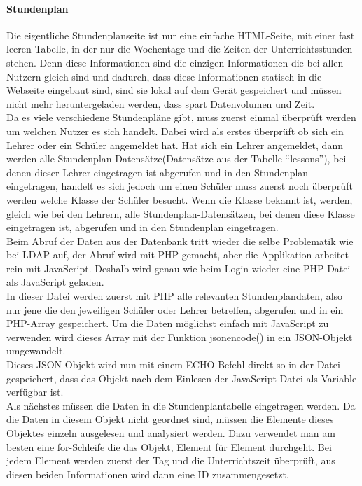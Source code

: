 \paragraph{Stundenplan\\}
Die eigentliche Stundenplanseite ist nur eine einfache HTML-Seite, mit einer fast leeren Tabelle, in der nur die Wochentage und die Zeiten der Unterrichtsstunden stehen. Denn diese Informationen sind die einzigen Informationen die bei allen Nutzern gleich sind und dadurch, dass diese Informationen statisch in die Webseite eingebaut sind, sind sie lokal auf dem Gerät gespeichert und müssen nicht mehr heruntergeladen werden, dass spart Datenvolumen und Zeit.\\
Da es viele verschiedene Stundenpläne gibt, muss zuerst einmal überprüft werden um welchen Nutzer es sich handelt. Dabei wird als erstes überprüft ob sich ein Lehrer oder ein Schüler angemeldet hat. Hat sich ein Lehrer angemeldet, dann werden alle Stundenplan-Datensätze(Datensätze aus der Tabelle \enquote{lessons}), bei denen dieser Lehrer eingetragen ist abgerufen und in den Stundenplan eingetragen, handelt es sich jedoch um einen Schüler muss zuerst noch überprüft werden welche Klasse der Schüler besucht. Wenn die Klasse bekannt ist, werden, gleich wie bei den Lehrern, alle Stundenplan-Datensätzen, bei denen diese Klasse eingetragen ist, abgerufen und in den Stundenplan eingetragen.\\
Beim Abruf der Daten aus der Datenbank tritt wieder die selbe Problematik wie bei LDAP auf, der Abruf wird mit PHP gemacht, aber die Applikation arbeitet rein mit JavaScript. Deshalb wird genau wie beim Login wieder eine PHP-Datei als JavaScript geladen.\\
In dieser Datei werden zuerst mit PHP alle relevanten Stundenplandaten, also nur jene die den jeweiligen Schüler oder Lehrer betreffen, abgerufen und in ein PHP-Array gespeichert. Um die Daten möglichst einfach mit JavaScript zu verwenden wird dieses Array mit der Funktion jsonencode() in ein JSON-Objekt umgewandelt.\\
Dieses JSON-Objekt wird nun mit einem ECHO-Befehl direkt so in der Datei gespeichert, dass das Objekt nach dem Einlesen der JavaScript-Datei als Variable verfügbar ist.\\
Als nächstes müssen die Daten in die Stundenplantabelle eingetragen werden. Da die Daten in diesem Objekt nicht geordnet sind, müssen die Elemente dieses Objektes einzeln ausgelesen und analysiert werden. Dazu verwendet man am besten eine for-Schleife die das Objekt, Element für Element durchgeht. Bei jedem Element werden zuerst der Tag und die Unterrichtszeit überprüft, aus diesen beiden Informationen wird dann eine ID zusammengesetzt.\\
